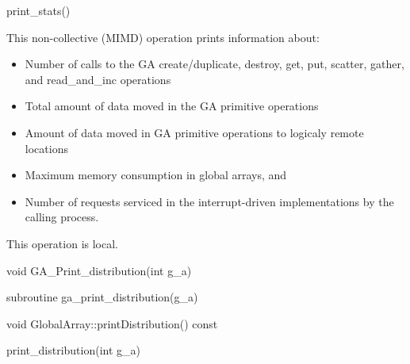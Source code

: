 \documentclass[12pt]{article}
\begin{document}
\begin{pyapi}
\begin{pycode}
print_stats()  
\end{pycode}
\end{pyapi}
\local
\begin{desc}

This non-collective (MIMD) operation prints information about:
\begin{itemize}
    \item Number of calls to the GA create/duplicate, destroy, get, 
     put, scatter, gather, and read_and_inc operations
    \item Total amount of data moved in the GA primitive operations
    \item Amount of data moved in GA primitive operations to logicaly 
     remote locations
    \item Maximum memory consumption in global arrays, and
    \item Number of requests serviced in the interrupt-driven implementations 
     by the calling process.
\end{itemize}

This operation is local.
\end{desc}


\begin{capi}
\begin{ccode}
void GA_Print_distribution(int g_a)
\end{ccode}
\begin{funcargs}
\end{funcargs}
\end{capi}

\begin{fapi}
\begin{fcode}
subroutine ga_print_distribution(g_a)   
\end{fcode}
\begin{funcargs}
\end{funcargs}
\end{fapi}

\begin{cxxapi}
\begin{cxxcode}
void GlobalArray::printDistribution() const
\end{cxxcode}
\end{cxxapi}

\begin{pyapi}
\begin{pycode}
print_distribution(int g_a) 
\end{pycode}
\end{pyapi} 
\end{document}
